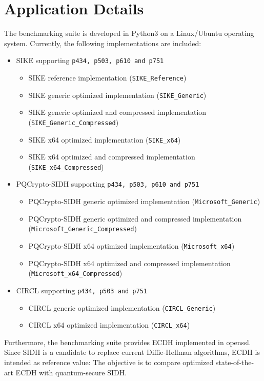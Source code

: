 \section{Application Details}\label{sec:benchmarks_details}
The benchmarking suite is developed in Python3 on a Linux/Ubuntu operating system. Currently, the following implementations are included:
\label{sec:included_implementations}
\begin{itemize}
\item \gls{SIKE} supporting \texttt{p434, p503, p610 and p751}
	\begin{itemize}
	\item SIKE reference implementation (\texttt{SIKE\_Reference})
	\item SIKE generic optimized implementation (\texttt{SIKE\_Generic})
	\item SIKE generic optimized and compressed implementation (\texttt{SIKE\_Generic\_Compressed})
	\item SIKE x64 optimized implementation (\texttt{SIKE\_x64})
	\item SIKE x64 optimized and compressed implementation (\texttt{SIKE\_x64\_Compressed})
	\end{itemize}
\item \gls{PQCrypto-SIDH} supporting \texttt{p434, p503, p610 and p751}
	\begin{itemize}
	\item PQCrypto-SIDH generic optimized implementation (\texttt{Microsoft\_Generic})
	\item PQCrypto-SIDH generic optimized and compressed implementation \\ (\texttt{Microsoft\_Generic\_Compressed})
	\item PQCrypto-SIDH x64 optimized implementation (\texttt{Microsoft\_x64})
	\item PQCrypto-SIDH x64 optimized and compressed implementation \\ (\texttt{Microsoft\_x64\_Compressed})
	\end{itemize}
\item CIRCL supporting \texttt{p434, p503 and p751}
	\begin{itemize}
	\item CIRCL generic optimized implementation (\texttt{CIRCL\_Generic})
	\item CIRCL x64 optimized implementation (\texttt{CIRCL\_x64})
	\end{itemize}
\end{itemize}
Furthermore, the benchmarking suite provides \gls{ECDH} implemented in \gls{openssl}. Since \gls{SIDH} is a candidate to replace current Diffie-Hellman algorithms, \gls{ECDH} is intended as reference value: The objective is to compare optimized state-of-the-art \gls{ECDH} with quantum-secure \gls{SIDH}.\\

